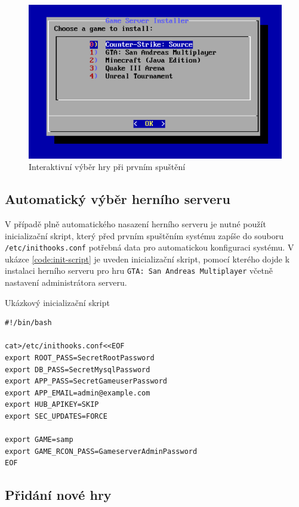 \begin{figure}[h]
    \centering
    \includegraphics[width=1\linewidth]{chapters/images/game-selection.pdf}
    \caption{Interaktivní výběr hry při prvním spuštění}
    \label{fig:game-selection}
\end{figure}

\subsection{Automatický výběr herního serveru}

V případě plně automatického nasazení herního serveru je nutné použít inicializační skript, který před prvním spuštěním systému
zapíše do souboru \texttt{/etc/inithooks.conf} potřebná data pro automatickou konfiguraci systému.
V ukázce \ref{code:init-script} je uveden inicializační skript, pomocí kterého dojde k instalaci herního serveru pro hru \texttt{GTA: San Andreas Multiplayer}
včetně nastavení administrátora serveru.

\begin{listing}[h!]
    \caption{Ukázkový inicializační skript}
    \label{code:init-script}
    \begin{verbatim}
#!/bin/bash

cat>/etc/inithooks.conf<<EOF
export ROOT_PASS=SecretRootPassword
export DB_PASS=SecretMysqlPassword
export APP_PASS=SecretGameuserPassword
export APP_EMAIL=admin@example.com
export HUB_APIKEY=SKIP
export SEC_UPDATES=FORCE

export GAME=samp
export GAME_RCON_PASS=GameserverAdminPassword
EOF
    \end{verbatim}
\end{listing}

\subsection{Přidání nové hry}


